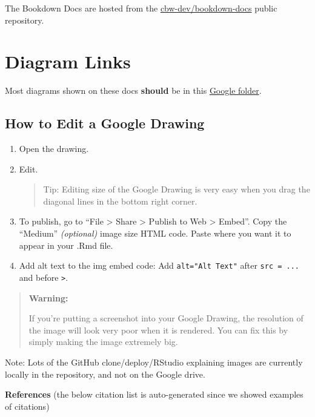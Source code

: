 \documentclass[
]{book}
\theoremstyle{definition}
\theoremstyle{definition}
\theoremstyle{definition}
\theoremstyle{definition}
\theoremstyle{remark}
\begin{document}
The Bookdown Docs are hosted from the \href{https://github.com/cbw-dev/bookdown-docs}{cbw-dev/bookdown-docs} public repository.

\section{Diagram Links}\label{diagram-links}

Most diagrams shown on these docs \textbf{should} be in this \href{https://drive.google.com/drive/folders/136sy6WIiSG3tBFVpHt8yQwLakB4TFJvn?usp=sharing}{Google folder}.

\subsection{How to Edit a Google Drawing}\label{how-to-edit-a-google-drawing}

\begin{enumerate}
\def\labelenumi{\arabic{enumi}.}
\item
  Open the drawing.
\item
  Edit.

  \begin{quote}
  Tip: Editing size of the Google Drawing is very easy when you drag the diagonal lines in the bottom right corner.
  \end{quote}
\item
  To publish, go to ``File \textgreater{} Share \textgreater{} Publish to Web \textgreater{} Embed''. Copy the ``Medium'' \emph{(optional)} image size HTML code. Paste where you want it to appear in your .Rmd file.
\item
  Add alt text to the img embed code: Add \texttt{alt="Alt\ Text"} after \texttt{src\ =\ ...} and before \texttt{\textgreater{}}.
\end{enumerate}

\begin{quote}
\textbf{Warning:}

If you're putting a screenshot into your Google Drawing, the resolution of the image will look very poor when it is rendered. You can fix this by simply making the image extremely big.
\end{quote}

Note: Lots of the GitHub clone/deploy/RStudio explaining images are currently locally in the repository, and not on the Google drive.

\textbf{References} (the below citation list is auto-generated since we showed examples of citations)

  
\end{document}
